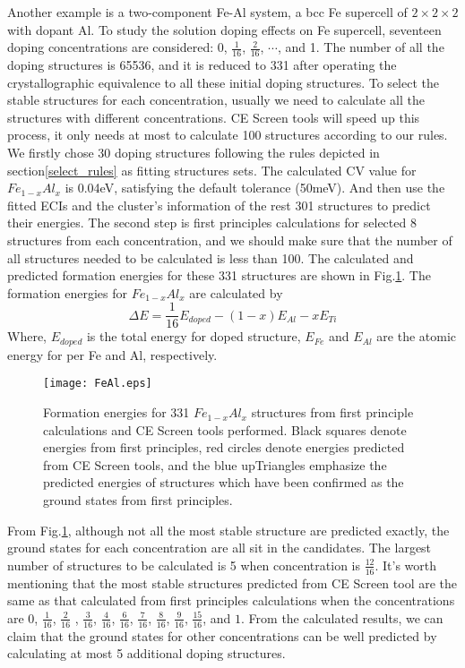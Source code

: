 \documentclass[aps,preprint,amsmath,amssymb]{revtex4}
\begin{document}
Another example is a two-component Fe-Al system, a bcc Fe supercell of $2\times2\times2$ with dopant Al.
To study the solution doping effects on Fe supercell, seventeen doping concentrations are
considered: 0, $\frac{1}{16}$, $\frac{2}{16}$, $\cdots$, and 1. The number of all the doping structures is 65536, and it is reduced to 331 after
operating the crystallographic equivalence to all these initial doping structures. To select the stable structures for each concentration,
usually we need to calculate all the structures with different concentrations.
CE Screen tools will speed up this process, it only needs at most to calculate 100 structures according to our rules.
We firstly chose 30 doping structures following the rules depicted in section\ref{select_rules} as fitting structures sets.
The calculated CV value for $Fe_{1-x}Al_{x}$ is 0.04eV, satisfying the default tolerance (50meV).
And then use the fitted ECIs and the cluster's information of the rest 301 structures to predict their energies.
The second step is first principles calculations for selected 8 structures from each concentration, and we should make sure that
the number of all structures needed to be calculated is less than 100.
The calculated and predicted formation energies for these 331 structures are
shown in Fig.\ref{Fe-Al}. The formation energies for $Fe_{1-x}Al_{x}$ are calculated by
\begin{equation}\label{Fe-Al-E}
  \Delta{E}=\frac{1}{16}E_{doped}-(1-x)E_{Al}-xE_{Ti}
\end{equation}
Where, $E_{doped}$ is the total energy for doped structure, $E_{Fe}$ and $E_{Al}$ are the atomic energy for per Fe and Al, respectively.
\begin{figure}
\texttt{[image: FeAl.eps]}
\caption{Formation energies for 331 $Fe_{1-x}Al_{x}$ structures from first principle calculations and CE Screen tools performed.
Black squares denote energies from first principles, red circles denote energies predicted from CE Screen tools, and the blue
upTriangles emphasize the predicted energies of structures which have been confirmed as the ground states from first principles.}\label{Fe-Al}
\end{figure}
From Fig.\ref{Fe-Al}, although not all the most stable structure are predicted exactly, the ground states for each concentration are all
sit in the candidates. The largest number of structures to be calculated is 5 when concentration is $\frac{12}{16}$. It's worth mentioning that
the most stable structures predicted from CE Screen tool are the same as that calculated from first principles calculations when the concentrations
are 0, $\frac{1}{16}$, $\frac{2}{16}$ , $\frac{3}{16}$, $\frac{4}{16}$, $\frac{6}{16}$, $\frac{7}{16}$,
$\frac{8}{16}$, $\frac{9}{16}$, $\frac{15}{16}$, and $1$.
From the calculated results, we can claim that the ground states for other concentrations
can be well predicted by calculating at most 5 additional doping structures.
\end{document}
